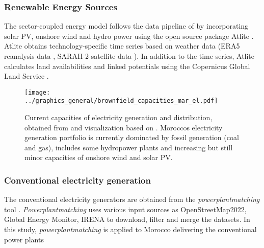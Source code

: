 


\subsubsection{Renewable Energy Sources}
The sector-coupled energy model follows the data pipeline of \cite{Parzen2023} by incorporating solar PV, onshore wind and hydro power using the open source package Atlite \cite{Hofmann2021}. %
Atlite obtains technology-specific time series based on weather data (ERA5 reanalysis data \cite{Hersbach2020}, SARAH-2 satellite data \cite{Pfeifroth2017}). %
In addition to the time series, Atlite calculates land availabilities and linked potentials using the Copernicus Global Land Service \cite{Buchhorn2020}.





\begin{figure*}[t]
    \centering
    \texttt{[image: ../graphics\_general/brownfield\_capacities\_mar\_el.pdf]}
    \caption{Current capacities of electricity generation and distribution, obtained from \cite{Parzen2022} and visualization based on \cite{Horsch2018}. Moroccos electricity generation portfolio is currently dominated by fossil generation (coal and gas), includes some hydropower plants and increasing but still minor capacities of onshore wind and solar PV.}
    \label{fig:MAR_brownfield}
\end{figure*}


\subsubsection{Conventional electricity generation}
The conventional electricity generators are obtained from the \textit{powerplantmatching} tool \cite{Powerplantmatching2019}. \textit{Powerplantmatching} uses various input sources as OpenStreetMap2022, Global Energy Monitor, IRENA \cite{IRENA2022, OpenStreetMap2022, GlobalEnergyMonitor} to download, filter and merge the datasets. 
In this study, \textit{powerplantmatching} is applied to Morocco delivering the conventional power plants%


